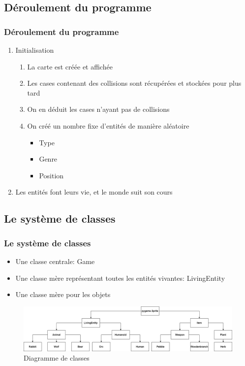 \documentclass{beamer}
\begin{document}
\subsection{Déroulement du programme}

\begin{frame} \frametitle{Déroulement du programme}
	\begin{enumerate}
		\item Initialisation
			\begin{enumerate}
				\item La carte est créée et affichée
				\item Les cases contenant des collisions sont récupérées et stockées pour plus tard
				\item On en déduit les cases n'ayant pas de collisions
				\item On créé un nombre fixe d'entités de manière aléatoire
					\begin{itemize}
						\item Type
						\item Genre
						\item Position
					\end{itemize}
			\end{enumerate}
		\item Les entités font leurs vie, et le monde suit son cours
	\end{enumerate}
\end{frame}

\subsection{Le système de classes}

\begin{frame} \frametitle{Le système de classes}
	\begin{itemize}
		\item Une classe centrale: Game
		\item Une classe mère représentant toutes les entités vivantes: LivingEntity
		\item Une classe mère pour les objets
	\end{itemize}
	\begin{figure}
		\includegraphics[scale=0.24]{diagramme_class.png}
		\caption{Diagramme de classes}
		\label{Diagramme de classes}
	\end{figure}
\end{frame}
\end{document}
